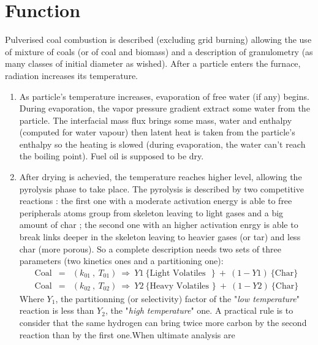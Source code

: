 
\section*{Function}

Pulverised coal combustion is described (excluding grid burning) allowing the
use of mixture of coals (or of coal and biomass) and a description of
granulometry (as many classes of initial diameter as wished). After a particle
enters the furnace, radiation increases its temperature.
\begin{enumerate}
\item As particle's temperature increases, evaporation of free water (if any)
  begins. During evaporation, the vapor pressure gradient extract some water
  from the particle. The interfacial mass flux brings some mass, water and
  enthalpy (computed for water vapour) then latent heat is taken from the
  particle's enthalpy so the heating is slowed (during evaporation, the water
  can't reach the boiling point). Fuel oil is supposed to be dry.
\item After drying is achevied, the temperature reaches higher level, allowing
  the pyrolysis phase to take place. The pyrolysis is described by two
  competitive reactions : the first one with a moderate activation energy is
  able to free peripherals atoms group from skeleton leaving to light gases and
  a big amount of char ; the second one with an higher activation enrgy is able
  to break links deeper in the skeleton leaving to heavier gases (or tar) and
  less char (more porous). So a complete description needs two sets of three
  parameters (two kinetics ones and a partitioning one):
\begin{eqnarray}
\mbox{Coal} &=&(k_{01}~,~ T_{01}) ~\Rightarrow~ Y1~\{ \mbox{Light Volatiles~~}\} ~+~ (1-Y1)~\{ \mbox{Char} \} \\
\mbox{Coal} &=&(k_{02}~,~ T_{02}) ~\Rightarrow~ Y2~\{\mbox{Heavy Volatiles~} \}   ~+~ (1-Y2)~\{ \mbox{Char} \}
\end{eqnarray}
Where $Y_1$, the partitionning (or selectivity) factor of the "{\em low
  temperature}" reaction is less than $Y_2$, the "{\em high temperature}" one.
A practical rule is to consider that the same hydrogen can bring twice more
carbon by the second reaction than by the first one.When ultimate analysis are

\end{enumerate}
